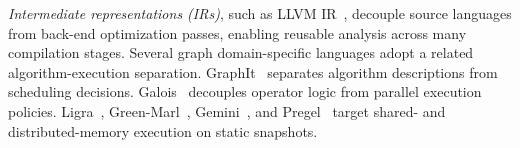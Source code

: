 \textit{Intermediate representations (IRs)}, such as LLVM
IR~\cite{Lattner2004LLVM}, decouple source languages from back-end
optimization passes, enabling reusable analysis across many
compilation stages.
Several graph domain-specific languages adopt a related
algorithm-execution separation.
GraphIt~\cite{Zhang2018GraphIt} separates algorithm descriptions from
scheduling decisions.
Galois~\cite{nguyen2013lightweight} decouples
operator logic from parallel execution policies.
Ligra~\cite{Shun2013Ligra}, Green-Marl~\cite{hong2012green},
Gemini~\cite{zhu2016gemini}, and Pregel~\cite{malewicz2010pregel}
target shared- and distributed-memory execution on static snapshots.




